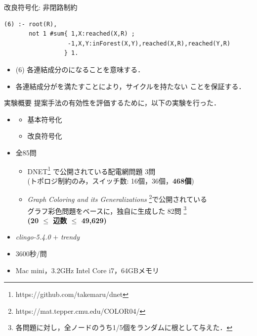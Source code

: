 \documentclass[dvipdfmx,11pt]{beamer}
\begin{document}
\begin{frame}[fragile]{改良符号化: 非閉路制約}
\begin{minipage}[c]{1.01\textwidth}
\begin{exampleblock}{}\small
\begin{lstlisting}
(6) :- root(R),
       not 1 #sum{ 1,X:reached(X,R) ;
                  -1,X,Y:inForest(X,Y),reached(X,R),reached(Y,R)
                 } 1.
\end{lstlisting}
\end{exampleblock}
\end{minipage}
\vfill
\begin{itemize}
\item (6) 各連結成分のになることを意味する．
\item 各連結成分がを満たすことにより，サイクルを持たない
	  ことを保証する．
\end{itemize}
\end{frame}
\begin{frame}{実験概要}
  \renewcommand{\thefootnote}{\fnsymbol{footnote}}
  \setcounter{footnote}{1}
  提案手法の有効性を評価するために，以下の実験を行った．
  \begin{itemize}
  \item {}
    \begin{itemize}
    \item 基本符号化
    \item 改良符号化
    \end{itemize}
  \item {} 全85問
    \begin{itemize}
    \item DNET\footnote{https://github.com/takemaru/dnet}%
      で公開されている配電網問題 3問 \\ (トポロジ制約のみ，スイッチ数:
      16個，36個，\alert{\bf 468個})
    \item \textit{Graph Coloring and its Generalizations}
      \footnote{https://mat.tepper.cmu.edu/COLOR04/}で公開されている \\
      グラフ彩色問題をベースに，独自に生成した 82問 
      \footnote{各問題に対し，全ノードのうち1/5個をランダムに根として与えた．}\\
      \alert{\bf (20 $\leq$ 辺数 $\leq$ 49,629)}
    \end{itemize}
  \item {} \textit{clingo-5.4.0} $+$ \textit{trendy}
  \item {} 3600秒/問
  \item {} Mac mini，3.2GHz Intel Core i7，64GBメモリ
  \end{itemize}
\end{frame}
\end{document}
